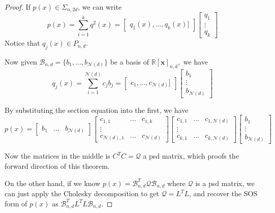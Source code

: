 \documentclass[12pt]{amsart}
\numberwithin{equation}{section}
\theoremstyle{definition}
\numberwithin{thm}{section}
\begin{document}
\begin{proof}
     If $p(x) \in \Sigma_{n, 2d}$, we can write 
     \begin{equation*}
          p(x) = \sum_{i = 1} ^ k q^2(x) = \begin{bmatrix} q_1(x),... ,q_k(x)] \end{bmatrix}  \begin{bmatrix} q_1 \\ \vdots \\ q_{k} \end{bmatrix}
     \end{equation*}
     Notice that $q_j(x) \in P_{n, d}.$ 
     
     Now given $\mathcal{B}_{n, d} = \{b_1, ..., b_{\mathcal{N}(d)}\}$ be a basis of $\mathbb{R}[\mathbf{x}]_{n, d},$ 
     we have 
     \begin{equation*} q_j(x) = \sum_{i = 1}^{\mathcal{N}(d)} c_j b_j = \begin{bmatrix} c_1,..., c_{\mathcal{N}(d)}] \end{bmatrix} \begin{bmatrix} b_1 \\ \vdots \\ b_{\mathcal{N}(d)} \end{bmatrix} \end{equation*}

     By substituting the section equation into the first, we have
     \begin{equation*}
          p(x) = 
               \begin{bmatrix} b_1 & ...& b_{\mathcal{N}(d)}
               \end{bmatrix} 
               \begin{bmatrix}
               c_{1,1} & ... & c_{1,k} \\
               \vdots\\
               c_{{\mathcal{N}(d)},1} & ... & c_{\mathcal{N}(d)}
               \end{bmatrix}
               \begin{bmatrix}
                    c_{1,1} & ... & c_{1,{\mathcal{N}(d)}} \\
                    \vdots\\
                    c_{k,1} & ... & c_{k, {\mathcal{N}(d)}}
               \end{bmatrix}
               \begin{bmatrix} b_1 \\ \vdots \\ b_{\mathcal{N}(d)}
               \end{bmatrix} 
     \end{equation*}

     Now the matrices in the middle is $C^T C = \mathcal{Q}$ a psd matrix, which proofs the forward direction of this theorem.

     On the other hand, if we know $p(x) = \mathcal{B}_{n, d}^T \mathcal{Q} \mathcal{B}_{n, d}$ where $\mathcal{Q}$ is a psd matrix, 
     we can just apply the Cholesky decomposition to get $\mathcal{Q} = L^T L$, and recover the SOS form of $p(x)$ as
     $\mathcal{B}_{n, d}^T L^T L \mathcal{B}_{n, d}$. 
\end{proof}
\end{document}
